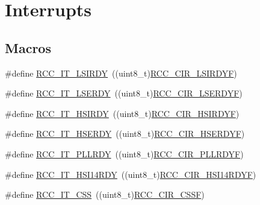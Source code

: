 \hypertarget{group___r_c_c___interrupt}{}\section{Interrupts}
\label{group___r_c_c___interrupt}
\subsection*{Macros}
\begin{DoxyCompactItemize}
\item 
\#define \hyperlink{group___r_c_c___interrupt_ga2b4ef277c1b71f96e0bef4b9a72fca94}{R\+C\+C\+\_\+\+I\+T\+\_\+\+L\+S\+I\+R\+DY}~((uint8\+\_\+t)\hyperlink{group___peripheral___registers___bits___definition_gacb94ccfe6a212f020e732d1dd787a6fb}{R\+C\+C\+\_\+\+C\+I\+R\+\_\+\+L\+S\+I\+R\+D\+YF})
\item 
\#define \hyperlink{group___r_c_c___interrupt_gad6b6e78a426850f595ef180d292a673d}{R\+C\+C\+\_\+\+I\+T\+\_\+\+L\+S\+E\+R\+DY}~((uint8\+\_\+t)\hyperlink{group___peripheral___registers___bits___definition_gabfc100e7ae673dfcec7be79af0d91dfe}{R\+C\+C\+\_\+\+C\+I\+R\+\_\+\+L\+S\+E\+R\+D\+YF})
\item 
\#define \hyperlink{group___r_c_c___interrupt_ga69637e51b71f73f519c8c0a0613d042f}{R\+C\+C\+\_\+\+I\+T\+\_\+\+H\+S\+I\+R\+DY}~((uint8\+\_\+t)\hyperlink{group___peripheral___registers___bits___definition_gad38877547c4cbbb94659d5726f377163}{R\+C\+C\+\_\+\+C\+I\+R\+\_\+\+H\+S\+I\+R\+D\+YF})
\item 
\#define \hyperlink{group___r_c_c___interrupt_gad13eaede352bca59611e6cae68665866}{R\+C\+C\+\_\+\+I\+T\+\_\+\+H\+S\+E\+R\+DY}~((uint8\+\_\+t)\hyperlink{group___peripheral___registers___bits___definition_ga11ea196450aac9ac35e283a66afc3da6}{R\+C\+C\+\_\+\+C\+I\+R\+\_\+\+H\+S\+E\+R\+D\+YF})
\item 
\#define \hyperlink{group___r_c_c___interrupt_ga68d48e7811fb58f2649dce6cf0d823d9}{R\+C\+C\+\_\+\+I\+T\+\_\+\+P\+L\+L\+R\+DY}~((uint8\+\_\+t)\hyperlink{group___peripheral___registers___bits___definition_ga0f007895a17e668f22f7b8b24ca90aec}{R\+C\+C\+\_\+\+C\+I\+R\+\_\+\+P\+L\+L\+R\+D\+YF})
\item 
\#define \hyperlink{group___r_c_c___interrupt_ga3b85dd0ddf5c816fad2bb2c149129c01}{R\+C\+C\+\_\+\+I\+T\+\_\+\+H\+S\+I14\+R\+DY}~((uint8\+\_\+t)\hyperlink{group___peripheral___registers___bits___definition_ga50433b2663ccee3a4ad2f219da4b74b6}{R\+C\+C\+\_\+\+C\+I\+R\+\_\+\+H\+S\+I14\+R\+D\+YF})
\item 
\#define \hyperlink{group___r_c_c___interrupt_ga9bb34a4912d2084dc1c0834eb53aa7a3}{R\+C\+C\+\_\+\+I\+T\+\_\+\+C\+SS}~((uint8\+\_\+t)\hyperlink{group___peripheral___registers___bits___definition_gad66b719e4061294de35af58cc27aba7f}{R\+C\+C\+\_\+\+C\+I\+R\+\_\+\+C\+S\+SF})
\end{DoxyCompactItemize}


